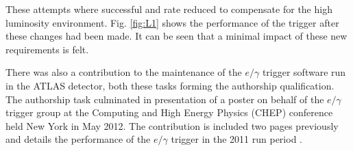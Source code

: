 These attempts where successful and rate reduced to compensate for the high luminosity environment. Fig. \ref{fig:L1} shows the performance of the trigger after these changes had been made. It can be seen that a minimal impact of these new requirements is felt.


There was also a contribution to the maintenance of the $e/\gamma$ trigger software run in the ATLAS detector, both these tasks forming the authorship qualification. The authorship task culminated in presentation of a poster on behalf of the $e/\gamma$ trigger group at the Computing and High Energy Physics (CHEP) conference held New York in May 2012. The contribution is included two pages previously and details the performance of the $e/\gamma$ trigger in the 2011 run period \cite{poster}.

